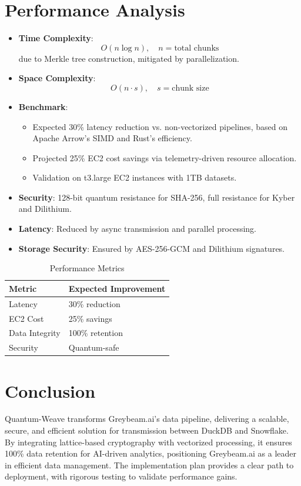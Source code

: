 \documentclass[12pt]{article}
\begin{document}
\section{Performance Analysis}
\begin{itemize}
    \item \textbf{Time Complexity}:
        \[
        O(n \log n), \quad n = \text{total chunks}
        \]
        due to Merkle tree construction, mitigated by parallelization.
    \item \textbf{Space Complexity}:
        \[
        O(n \cdot s), \quad s = \text{chunk size}
        \]
    \item \textbf{Benchmark}:
        \begin{itemize}
            \item Expected 30\% latency reduction vs. non-vectorized pipelines, based on Apache Arrow’s SIMD and Rust’s efficiency.
            \item Projected 25\% EC2 cost savings via telemetry-driven resource allocation.
            \item Validation on t3.large EC2 instances with 1TB datasets.
        \end{itemize}
    \item \textbf{Security}: 128-bit quantum resistance for SHA-256, full resistance for Kyber and Dilithium.
    \item \textbf{Latency}: Reduced by async transmission and parallel processing.
    \item \textbf{Storage Security}: Ensured by AES-256-GCM and Dilithium signatures.
\end{itemize}

\begin{table}[h]
\centering
\caption{Performance Metrics}
\begin{tabular}{ll}
\toprule
Metric & Expected Improvement \\
\midrule
Latency & 30\% reduction \\
EC2 Cost & 25\% savings \\
Data Integrity & 100\% retention \\
Security & Quantum-safe \\
\bottomrule
\end{tabular}
\end{table}

\section{Conclusion}
Quantum-Weave transforms Greybeam.ai’s data pipeline, delivering a scalable, secure, and efficient solution for transmission between DuckDB and Snowflake. By integrating lattice-based cryptography with vectorized processing, it ensures 100\% data retention for AI-driven analytics, positioning Greybeam.ai as a leader in efficient data management. The implementation plan provides a clear path to deployment, with rigorous testing to validate performance gains.
\end{document}
